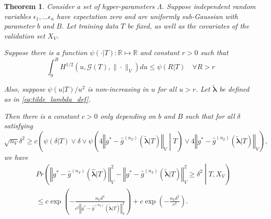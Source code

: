 \documentclass[10pt]{book}
\newtheorem{theorem}{Theorem}
\theoremstyle{definition}
\begin{document}
\begin{theorem}
	\label{thrm:train_val_complicated}
	Consider a set of hyper-parameters $\Lambda$.
	Suppose independent random variables $\epsilon_1, ... \epsilon_n$ have expectation zero and are uniformly sub-Gaussian with parameter $b$ and $B$.
	Let training data $T$ be fixed, as well as the covariates of the validation set $X_V$.
	
	Suppose there is a function $\psi(\cdot | T):\mathbb{R}\mapsto\mathbb{R}$ and constant $r > 0$ such that
	\begin{equation}
	\label{eq:dudley_bound}
	\int_{0}^{R}H^{1/2}(u,\mathcal{G}(T),\|\cdot\|_{V})du\le\psi(R| T) \quad \forall R>r
	\end{equation}
	
	Also, suppose $\psi\left(u | T \right)/u^{2}$ is non-increasing in $u$ for all $u > r$.
	Let $\tilde{\boldsymbol \lambda}$ be defined as in \eqref{eq:tilde_lambda_def}.
	
	Then there is a constant $c>0$ only depending on $b$ and $B$ such that for all $\delta$ satisfying
	\begin{equation}
	\label{eq:train_val_delta_condn}
	\sqrt{n_V}\delta^{2}
	\ge
	c \left ( 
	\psi(\delta| T)
	\vee 
	\delta
	\vee
	\psi \left (
	4\left\Vert g^* - \hat{g}^{(n_T)}( \tilde{\boldsymbol{\lambda}} | T)\right\Vert_{V}
	\middle | T
	\right ) 
	\vee
	4 \left\Vert g^* - \hat{g}^{(n_T)}( \tilde{\boldsymbol{\lambda}} | T)\right\Vert_{V}
	\right ),
	\end{equation}
	we have
	\begin{align*}
		& Pr\left(
		\left\Vert g^* - \hat{g}^{(n_T)}( \hat{\boldsymbol{\lambda}} | T) \right\Vert _{V}^2 -
		\left\Vert g^* - \hat{g}^{(n_T)}( \tilde{\boldsymbol{\lambda}} | T) \right\Vert _{V}^2
		\ge\delta^2
		\middle | 
		T, X_V
		\right )\\
		&\le c\exp\left(-\frac{n_{V}\delta^{4}}{
			c^{2}
			\left\Vert g^* - \hat{g}^{(n_T)}( \tilde{\boldsymbol{\lambda}} | T) \right\Vert _{V}^2
		}\right) 
		+c\exp\left(-\frac{n_{V}\delta^{2}}{c^{2}}\right).
	\end{align*}
\end{theorem}
\end{document}
